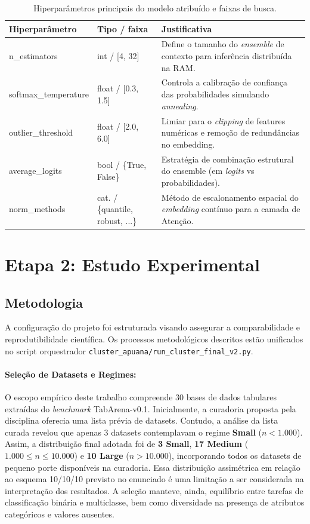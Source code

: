 \documentclass[12pt,a4paper]{article}
\begin{document}
\begin{table}[htbp]
\centering
\caption{Hiperparâmetros principais do modelo atribuído e faixas de busca.}
\label{tab:hiperparametros}
\vspace{0.2cm}
\begin{tabular}{llp{7cm}}
\toprule
\textbf{Hiperparâmetro} & \textbf{Tipo / faixa} & \textbf{Justificativa} \\ \midrule
n\_estimators & int / [4, 32] & Define o tamanho do \textit{ensemble} de contexto para inferência distribuída na RAM. \\
softmax\_temperature & float / [0.3, 1.5] & Controla a calibração de confiança das probabilidades simulando \textit{annealing}. \\
outlier\_threshold & float / [2.0, 6.0] & Limiar para o \textit{clipping} de features numéricas e remoção de redundâncias no embedding. \\
average\_logits & bool / \{True, False\} & Estratégia de combinação estrutural do ensemble (em \textit{logits} vs probabilidades). \\
norm\_methods & cat. / \{quantile, robust, ...\} & Método de escalonamento espacial do \textit{embedding} contínuo para a camada de Atenção. \\ \bottomrule
\end{tabular}
\end{table}

\section*{Etapa 2: Estudo Experimental}

\subsection{Metodologia}
A configuração do projeto foi estruturada visando assegurar a comparabilidade e reprodutibilidade científica. Os processos metodológicos descritos estão unificados no script orquestrador \texttt{cluster\_apuana/run\_cluster\_final\_v2.py}.

\paragraph{Seleção de Datasets e Regimes:} O escopo empírico deste trabalho compreende 30 bases de dados tabulares extraídas do \textit{benchmark} TabArena-v0.1. Inicialmente, a curadoria proposta pela disciplina oferecia uma lista prévia de datasets. Contudo, a análise da lista curada revelou que apenas 3 datasets contemplavam o regime \textbf{Small} ($n < 1.000$). Assim, a distribuição final adotada foi de \textbf{3 Small}, \textbf{17 Medium} ($1.000 \leq n \leq 10.000$) e \textbf{10 Large} ($n > 10.000$), incorporando todos os datasets de pequeno porte disponíveis na curadoria. Essa distribuição assimétrica em relação ao esquema 10/10/10 previsto no enunciado é uma limitação a ser considerada na interpretação dos resultados. A seleção manteve, ainda, equilíbrio entre tarefas de classificação binária e multiclasse, bem como diversidade na presença de atributos categóricos e valores ausentes.
\end{document}
